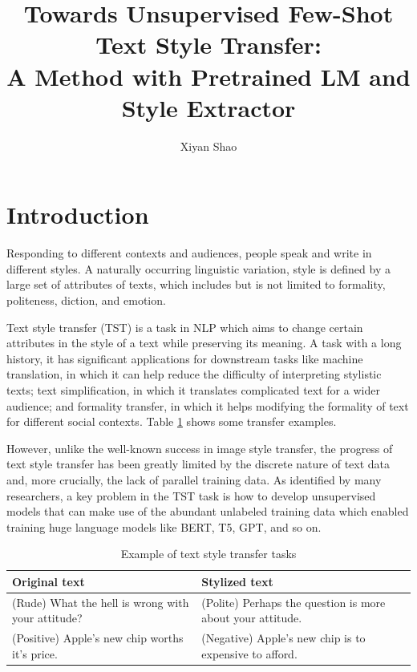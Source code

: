\documentclass[a2paper]{article}
\author{Xiyan Shao}
\title{Towards Unsupervised Few-Shot Text Style Transfer: \\ A Method with Pretrained LM and Style Extractor}
\begin{document}
\maketitle
\section{Introduction}
Responding to different contexts and audiences, people speak and write in different styles. A naturally occurring linguistic variation, style is defined by a large set of attributes of texts, which includes but is not limited to formality, politeness, diction, and emotion.

Text style transfer (TST) is a task in NLP which aims to change certain attributes in the style of a text while preserving its meaning. A task with a long history, it has significant applications for downstream tasks like machine translation, in which it can help reduce the difficulty of interpreting stylistic texts; text simplification, in which it translates complicated text for a wider audience; and formality transfer, in which it helps modifying the formality of text for different social contexts. Table \ref{tab:original_and_stylized_text} shows some transfer examples.

However, unlike the well-known success in image style transfer, the progress of text style transfer has been greatly limited by the discrete nature of text data and, more crucially, the lack of parallel training data. As identified by many researchers, a key problem in the TST task is how to develop unsupervised models that can make use of the abundant unlabeled training data which enabled training huge language models like BERT, T5, GPT, and so on.

\begin{table}[h!]
\centering
\label{tab:original_and_stylized_text}
\begin{tabularx}{\linewidth}{XX}
Original text & Stylized text \\ \midrule 
(Rude) What the hell is wrong with your attitude? & (Polite) Perhaps the question is more about your attitude.\\
(Positive) Apple's new chip worths it's price. & (Negative) Apple's new chip is to expensive to afford.\\
\end{tabularx}
\caption{Example of text style transfer tasks}
\label{tab:original_and_stylized_text}
\end{table}
\end{document}
